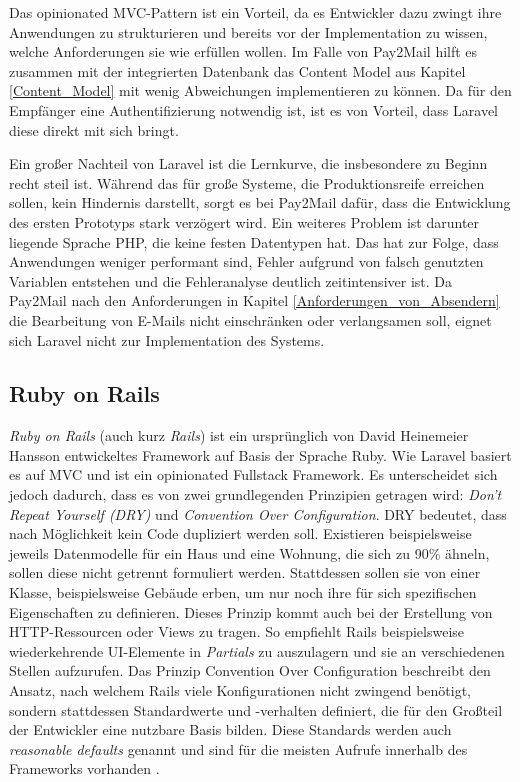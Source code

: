 \noindent Das opinionated MVC-Pattern ist ein Vorteil, da es Entwickler dazu zwingt ihre Anwendungen zu strukturieren und bereits vor der Implementation zu wissen, welche Anforderungen sie wie erfüllen wollen. Im Falle von Pay2Mail hilft es zusammen mit der integrierten Datenbank das Content Model aus Kapitel \ref{Content_Model} mit wenig Abweichungen implementieren zu können. Da für den Empfänger eine Authentifizierung notwendig ist, ist es von Vorteil, dass Laravel diese direkt mit sich bringt.

Ein großer Nachteil von Laravel ist die Lernkurve, die insbesondere zu Beginn recht steil ist. Während das für große Systeme, die Produktionsreife erreichen sollen, kein Hindernis darstellt, sorgt es bei Pay2Mail dafür, dass die Entwicklung des ersten Prototyps stark verzögert wird. Ein weiteres Problem ist darunter liegende Sprache PHP, die keine festen Datentypen hat. Das hat zur Folge, dass Anwendungen weniger performant sind, Fehler aufgrund von falsch genutzten Variablen entstehen und die Fehleranalyse deutlich zeitintensiver ist. Da Pay2Mail nach den Anforderungen in Kapitel \ref{Anforderungen_von_Absendern} die Bearbeitung von E-Mails nicht einschränken oder verlangsamen soll, eignet sich Laravel nicht zur Implementation des Systems.


\subsection{Ruby on Rails}
\label{Ruby_on_Rails}

\textit{Ruby on Rails} (auch kurz \textit{Rails}) ist ein ursprünglich von David Heinemeier Hansson entwickeltes Framework auf Basis der Sprache Ruby. Wie Laravel basiert es auf MVC und ist ein opinionated Fullstack Framework. Es unterscheidet sich jedoch dadurch, dass es von zwei grundlegenden Prinzipien getragen wird: \textit{Don't Repeat Yourself (DRY)} und \textit{Convention Over Configuration}. DRY bedeutet, dass nach Möglichkeit kein Code dupliziert werden soll. Existieren beispielsweise jeweils Datenmodelle für ein Haus und eine Wohnung, die sich zu 90\% ähneln, sollen diese nicht getrennt formuliert werden. Stattdessen sollen sie von einer Klasse, beispielsweise Gebäude erben, um nur noch ihre für sich spezifischen Eigenschaften zu definieren. Dieses Prinzip kommt auch bei der Erstellung von HTTP-Ressourcen oder Views zu tragen. So empfiehlt Rails beispielsweise wiederkehrende UI-Elemente in \textit{Partials} zu auszulagern und sie an verschiedenen Stellen aufzurufen. Das Prinzip Convention Over Configuration beschreibt den Ansatz, nach welchem Rails viele Konfigurationen nicht zwingend benötigt, sondern stattdessen Standardwerte und -verhalten definiert, die für den Großteil der Entwickler eine nutzbare Basis bilden. Diese Standards werden auch \textit{reasonable defaults} genannt und sind für die meisten Aufrufe innerhalb des Frameworks vorhanden \citep{Hansson2022a}.

